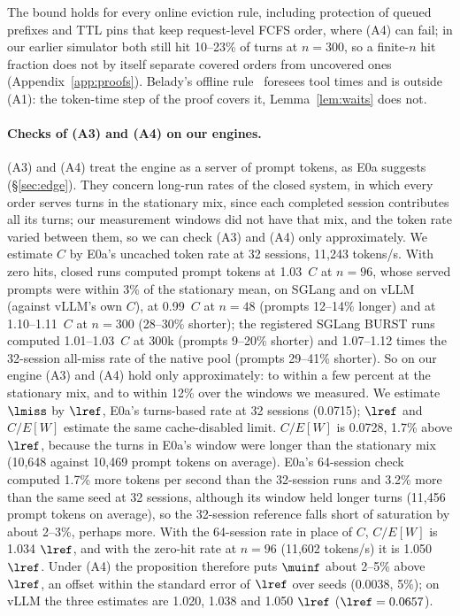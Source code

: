 The bound holds for every online eviction rule, including protection of queued prefixes and TTL pins that keep request-level FCFS order, where (A4) can fail; in our earlier simulator both still hit 10--23\% of turns at $n=300$, so a finite-$n$ hit fraction does not by itself separate covered orders from uncovered ones (Appendix~\ref{app:proofs}). Belady's offline rule~\citep{belady1966study} foresees tool times and is outside (A1): the token-time step of the proof covers it, Lemma~\ref{lem:waits} does not.

\paragraph{Checks of (A3) and (A4) on our engines.} (A3) and (A4) treat the engine as a server of prompt tokens, as E0a suggests (\S\ref{sec:edge}). They concern long-run rates of the closed system, in which every order serves turns in the stationary mix, since each completed session contributes all its turns; our measurement windows did not have that mix, and the token rate varied between them, so we can check (A3) and (A4) only approximately. We estimate $C$ by E0a's uncached token rate at 32 sessions, 11,243 tokens/s. With zero hits, closed runs computed prompt tokens at 1.03~$C$ at $n=96$, whose served prompts were within 3\% of the stationary mean, on SGLang and on vLLM (against vLLM's own $C$), at 0.99~$C$ at $n=48$ (prompts 12--14\% longer) and at 1.10--1.11~$C$ at $n=300$ (28--30\% shorter); the registered SGLang BURST runs computed 1.01--1.03~$C$ at 300k (prompts 9--20\% shorter) and 1.07--1.12 times the 32-session all-miss rate of the native pool (prompts 29--41\% shorter). So on our engine (A3) and (A4) hold only approximately: to within a few percent at the stationary mix, and to within 12\% over the windows we measured. We estimate $\lmiss$ by $\lref$, E0a's turns-based rate at 32 sessions (0.0715\sps); $\lref$ and $C/E[W]$ estimate the same cache-disabled limit. $C/E[W]$ is 0.0728\sps, 1.7\% above $\lref$, because the turns in E0a's window were longer than the stationary mix (10,648 against 10,469 prompt tokens on average). E0a's 64-session check computed 1.7\% more tokens per second than the 32-session runs and 3.2\% more than the same seed at 32 sessions, although its window held longer turns (11,456 prompt tokens on average), so the 32-session reference falls short of saturation by about 2--3\%, perhaps more. With the 64-session rate in place of $C$, $C/E[W]$ is 1.034 $\lref$, and with the zero-hit rate at $n=96$ (11,602 tokens/s) it is 1.050 $\lref$. Under (A4) the proposition therefore puts $\muinf$ about 2--5\% above $\lref$, an offset within the standard error of $\lref$ over seeds (0.0038\sps, 5\%); on vLLM the three estimates are 1.020, 1.038 and 1.050 $\lref$ ($\lref=0.0657$\sps).


